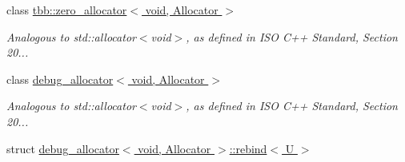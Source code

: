 \begin{DoxyCompactItemize}
\item 
class \hyperlink{classtbb_1_1zero__allocator_3_01void_00_01Allocator_01_4}{tbb\+::zero\+\_\+allocator$<$ void, Allocator $>$}
\begin{DoxyCompactList}\small\item\em Analogous to std\+::allocator$<$void$>$, as defined in I\+S\+O C++ Standard, Section 20... \end{DoxyCompactList}\item 
class \hyperlink{classdebug__allocator_3_01void_00_01Allocator_01_4}{debug\+\_\+allocator$<$ void, Allocator $>$}
\begin{DoxyCompactList}\small\item\em Analogous to std\+::allocator$<$void$>$, as defined in I\+S\+O C++ Standard, Section 20... \end{DoxyCompactList}\item 
struct \hyperlink{structdebug__allocator_3_01void_00_01Allocator_01_4_1_1rebind}{debug\+\_\+allocator$<$ void, Allocator $>$\+::rebind$<$ U $>$}
\end{DoxyCompactItemize}
